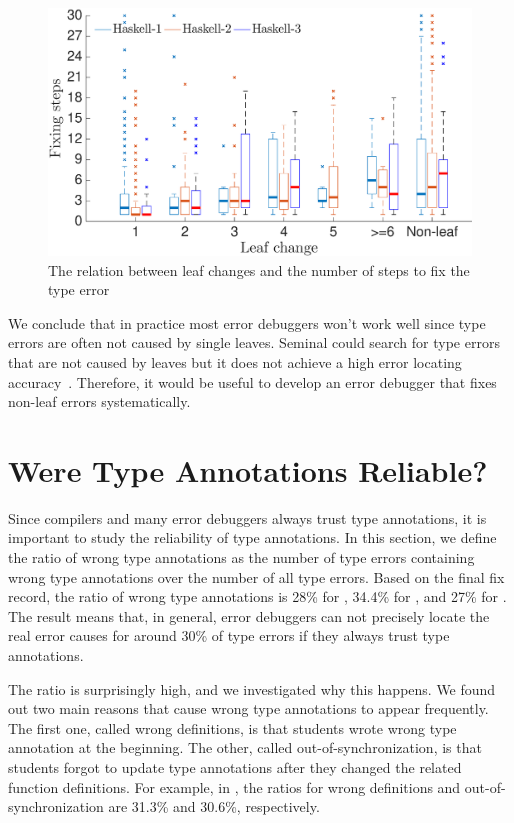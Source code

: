 \documentclass[12pt]{report}	%
\begin{document}
\begin{figure}
\centering
\includegraphics[width=.85\columnwidth]{images/leaf_step.eps}
\caption{The relation between leaf changes and the
number of steps to fix the type error}
\label{fig:lst}
\end{figure}

We conclude that in practice most error
debuggers won't work well since
type errors are
often not caused by single leaves.
Seminal could search for type errors that
are not caused by leaves
but it does not achieve a high error locating
accuracy~\cite{Zhang14:tgd,CE14popl}.
Therefore, it would be useful to develop
an error debugger that fixes non-leaf errors
systematically.


\section{Were Type Annotations Reliable?}
\label{sec:annotation}

Since compilers and many error debuggers always trust type annotations,
it is important to study the reliability of type annotations.
%
%
In this section, we define the ratio of wrong type annotations
as the number of type errors containing 
wrong type annotations 
over the number of all type errors.
%
Based on the final fix record, the ratio of wrong type annotations
is 28\% 
for \benchf, 34.4\% for \benchs, and 
27\% for \benchl. 
%
The result means that, in general, error debuggers can not
precisely locate the real error causes for around 30\% of
type errors if they always trust type annotations. 

The ratio is surprisingly high,
and we investigated why this happens.
%
We found out two main reasons that cause wrong type annotations
to appear frequently.
The first one, called wrong definitions, is that
students wrote wrong type annotation at the beginning.
The other, called out-of-synchronization,
is that students forgot to update type annotations
after they changed the related function definitions.
For example, in \benchs, the ratios for wrong definitions and
out-of-synchronization are 31.3\% and 30.6\%,
respectively.
\end{document}

